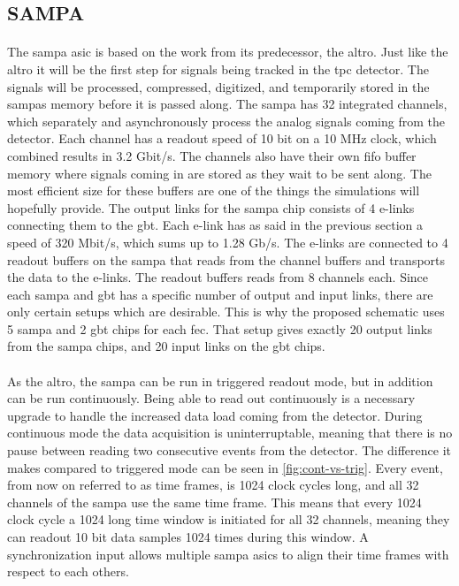 \documentclass[a4paper, 12pt]{report}
\begin{document}
\subsection{SAMPA}
\label{subsec:sampa}
\paragraph{}
The \gls{sampa} \gls{asic} is based on the work from its predecessor, the \gls{altro}.
Just like the \gls{altro} it will be the first step for signals being tracked in the \gls{tpc} detector.
The signals will be processed, compressed, digitized, and temporarily stored in the \glspl{sampa} memory before it is passed along.
The \gls{sampa} has 32 integrated channels, which separately and asynchronously process the analog signals coming from the detector\cite{tdr-016}.
Each channel has a readout speed of 10 bit on a 10 MHz clock, which combined results in 3.2 Gbit/s.
The channels also have their own \gls{fifo} buffer memory where signals coming in are stored as they wait to be sent along.
The most efficient size for these buffers are one of the things the simulations will hopefully provide.
The output links for the \gls{sampa} chip consists of 4 e-links connecting them to the \gls{gbt}.
Each e-link has as said in the previous section a speed of 320 Mbit/s, which sums up to 1.28 Gb/s\cite{tdr-015}.
The e-links are connected to 4 readout buffers on the \gls{sampa} that reads from the channel buffers and transports the data to the e-links.
The readout buffers reads from 8 channels each.
Since each \gls{sampa} and \gls{gbt} has a specific number of output and input links, there are only certain setups which are desirable.
This is why the proposed schematic uses 5 \gls{sampa} and 2 \gls{gbt} chips for each \gls{fec}.
That setup gives exactly 20 output links from the \gls{sampa} chips, and 20 input links on the \gls{gbt} chips.

\paragraph{}
As the \gls{altro}, the \gls{sampa} can be run in triggered readout mode, but in addition can be run continuously.
Being able to read out continuously is a necessary upgrade to handle the increased data load coming from the detector.
During continuous mode the data acquisition is uninterruptable, meaning that there is no pause between reading two consecutive events from the detector.
The difference it makes compared to triggered mode can be seen in \ref{fig:cont-vs-trig}.
Every event, from now on referred to as time frames, is 1024 clock cycles long, and all 32 channels of the \gls{sampa} use the same time frame.
This means that every 1024 clock cycle a 1024 long time window is initiated for all 32 channels, meaning they can readout 10 bit data samples 1024 times during this window.
A synchronization input allows multiple \gls{sampa} \gls{asic}s to align their time frames with respect to each others.\cite{tdr-015}
\end{document}

